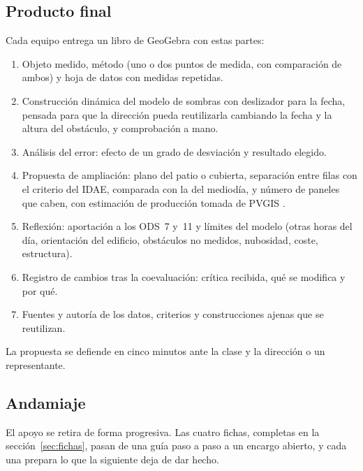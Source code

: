 \subsection{Producto final}
Cada equipo entrega un libro de GeoGebra con estas partes:
\begin{enumerate}[leftmargin=1.6em]
  \item Objeto medido, método (uno o dos puntos de medida, con comparación de ambos) y hoja de datos con medidas repetidas.
  \item Construcción dinámica del modelo de sombras con deslizador para la fecha, pensada para que la dirección pueda reutilizarla cambiando la fecha y la altura del obstáculo, y comprobación a mano.
  \item Análisis del error: efecto de un grado de desviación y resultado elegido.
  \item Propuesta de ampliación: plano del patio o cubierta, separación entre filas con el criterio del IDAE, comparada con la del mediodía, y número de paneles que caben, con estimación de producción tomada de PVGIS \parencite{pvgis}.
  \item Reflexión: aportación a los ODS~7 y~11 y límites del modelo (otras horas del día, orientación del edificio, obstáculos no medidos, nubosidad, coste, estructura).
  \item Registro de cambios tras la coevaluación: crítica recibida, qué se modifica y por qué.
  \item Fuentes y autoría de los datos, criterios y construcciones ajenas que se reutilizan.
\end{enumerate}
La propuesta se defiende en cinco minutos ante la clase y la dirección o un representante.

\subsection{Andamiaje}\label{sec:andamiaje}
El apoyo se retira de forma progresiva. Las cuatro fichas, completas en la sección~\ref{sec:fichas}, pasan de una guía paso a paso a un encargo abierto, y cada una prepara lo que la siguiente deja de dar hecho.

